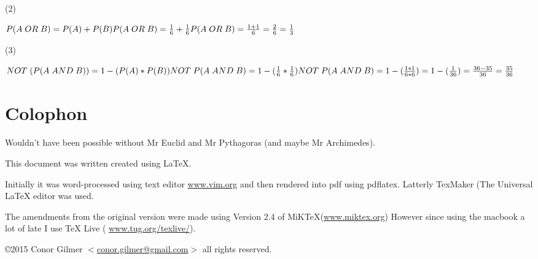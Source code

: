 \documentclass{article}
\begin{document}
(2)

$\\P(A\;OR\;B) = P(A) + P(B) \\
P(A\;OR\;B) = \frac{1}{6} + \frac{1}{6} \\
P(A\;OR\;B) = \frac{1 + 1}{6} = \frac{2}{6} = \frac{1}{3}
\\$

(3)

$\\NOT\;(P(A\;AND\;B)) = 1 - (P(A) * P(B)) \\
NOT \;P(A\;AND\;B) = 1 - (\frac{1}{6} * \frac{1}{6}) \\
NOT \; P(A\;AND\;B) = 1 -(\frac{1 * 1}{6 * 6}) = 1 - (\frac{1}{36}) = \frac{36-35}{36} = \frac{35}{36}
\\$

\newpage
\section{Colophon}

Wouldn't have been possible without Mr Euclid and Mr Pythagoras (and maybe Mr Archimedes).

This document was written created using \LaTeX{}. 

Initially it was word-processed using text editor \href{http://www.vim.org}{www.vim.org} and then rendered into pdf using pdflatex. Latterly TexMaker (The Universal LaTeX editor was used.

The amendments from the original version were made using Version 2.4 of MiKTeX(\href{http://www.miktex.org}{www.miktex.org})
However since using the macbook a lot of late I use \TeX{} Live ( \href{https://www.tug.org/texlive/}{www.tug.org/texlive/}).





\copyright 2015 Conor Gilmer $<$\href{mailto:conor.gilmer@gmail.com}{conor.gilmer@gmail.com}$>$ all rights reserved.
\end{document}
